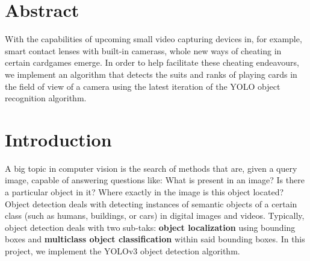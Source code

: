 \documentclass[a0,landscape]{a0poster}
\begin{document}
\vspace{1cm} %


\begin{multicols}{3} %


\color{Navy} %

\centering\section*{Abstract}
\raggedright	
\Large
With the capabilities of upcoming small video capturing devices in, for example, smart contact lenses with built-in camerass, whole new ways of cheating in certain cardgames emerge. In order to help facilitate these cheating endeavours, we implement an algorithm that detects the suits and ranks of playing cards in the field of view of a camera using the latest iteration of the YOLO object recognition algorithm.


\color{DarkSlateGray} %


\large
\section*{Introduction}
A big topic in computer vision is the search of methods that are, given a query image, capable of answering questions like: What is present in an image? Is there a particular object in it? Where exactly in the image is this object located?
Object detection deals with detecting instances of semantic objects of a certain class (such as humans, buildings, or cars) in digital images and videos. Typically, object detection deals with two sub-taks: \textbf{object localization} using bounding boxes and \textbf{multiclass object classification} within said bounding boxes.
In this project, we implement the YOLOv3 object detection algorithm.


\end{multicols}
\end{document}
